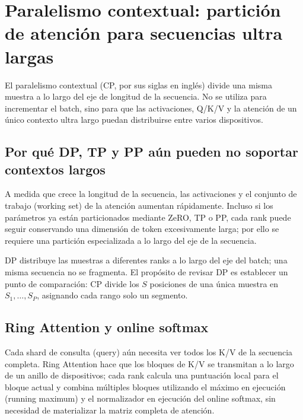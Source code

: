 \section{Paralelismo contextual: partición de atención para secuencias ultra largas}

El paralelismo contextual (CP, por sus siglas en inglés) divide una misma muestra a lo largo del eje de longitud de la secuencia. No se utiliza para incrementar el batch, sino para que las activaciones, Q/K/V y la atención de un único contexto ultra largo puedan distribuirse entre varios dispositivos.

\subsection{Por qué DP, TP y PP aún pueden no soportar contextos largos}

A medida que crece la longitud de la secuencia, las activaciones y el conjunto de trabajo (working set) de la atención aumentan rápidamente. Incluso si los parámetros ya están particionados mediante ZeRO, TP o PP, cada rank puede seguir conservando una dimensión de token excesivamente larga; por ello se requiere una partición especializada a lo largo del eje de la secuencia.


DP distribuye las muestras a diferentes ranks a lo largo del eje del batch; una misma secuencia no se fragmenta. El propósito de revisar DP es establecer un punto de comparación: CP divide los $S$ posiciones de una única muestra en $S_1,\ldots,S_P$, asignando cada rango solo un segmento.



\subsection{Ring Attention y online softmax}

Cada shard de consulta (query) aún necesita ver todos los K/V de la secuencia completa. Ring Attention hace que los bloques de K/V se transmitan a lo largo de un anillo de dispositivos; cada rank calcula una puntuación local para el bloque actual y combina múltiples bloques utilizando el máximo en ejecución (running maximum) y el normalizador en ejecución del online softmax, sin necesidad de materializar la matriz completa de atención.

